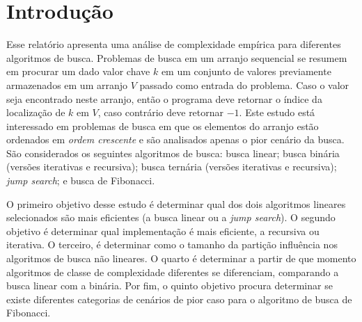 \chapter{Introdução}

Esse relatório apresenta uma análise de complexidade empírica para diferentes algoritmos de busca. Problemas de busca em um arranjo sequencial se resumem em procurar um dado valor chave $k$ em um conjunto de valores previamente armazenados em um arranjo $V$ passado como entrada do problema. Caso o valor seja encontrado neste arranjo, então o programa deve retornar o índice da localização de $k$ em $V$, caso contrário deve retornar $-1$. Este estudo está interessado em problemas de busca em que os elementos do arranjo estão ordenados em {\it ordem crescente} e são analisados apenas o pior cenário da busca. São considerados os seguintes algoritmos de busca: busca linear; busca binária (versões iterativas e recursiva); busca ternária (versões iterativas e recursiva); {\it jump search}; e busca de Fibonacci.

O primeiro objetivo desse estudo é determinar qual dos dois algoritmos lineares selecionados são mais eficientes (a busca linear ou a {\it jump search}). O segundo objetivo é determinar qual implementação é mais eficiente, a recursiva ou iterativa. O terceiro, é determinar como o tamanho da partição influência nos algoritmos de busca não lineares. O quarto é determinar a partir de que momento algoritmos de classe de complexidade diferentes se diferenciam, comparando a busca linear com a binária. Por fim, o quinto objetivo procura determinar se existe diferentes categorias de cenários de pior caso para o algoritmo de busca de Fibonacci.

